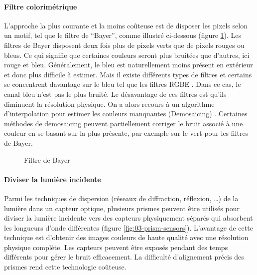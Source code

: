 \documentclass[../thesis.tex]{subfiles}
\begin{document}
    \paragraph{Filtre colorimétrique}
    L'approche la plus courante et la moins coûteuse est de disposer les pixels selon un motif, tel que le filtre de ``Bayer'', comme illustré ci-dessous (figure \ref{fig:03-bayer-filter}). Les filtres de Bayer disposent deux fois plus de pixels verts que de pixels rouges ou bleus. Ce qui signifie que certaines couleurs seront plus bruitées que d'autres, ici rouge et bleu. Généralement, le bleu est naturellement moins présent en extérieur et donc plus difficile à estimer. Mais il existe différents types de filtres et certains se concentrent davantage sur le bleu tel que les filtres RGBE \cite{miao2004generic}. Dans ce cas, le canal bleu n'est pas le plus bruité. Le désavantage de ces filtres est qu'ils diminuent la résolution physique. On a alors recours à un algorithme d'interpolation pour estimer les couleurs manquantes (Demosaicing) \cite{rathi2021convolution}. Certaines méthodes de demosaicing peuvent partiellement corriger le bruit associé à une couleur \cite{tan2014green} en se basant sur la plus présente, par exemple sur le vert pour les filtres de Bayer.
    
    \begin{figure}[H]
        \centering
        
        \caption{Filtre de Bayer}
        \label{fig:03-bayer-filter}
    \end{figure}
    
    \paragraph{Diviser la lumière incidente}
    
    Parmi les techniques de dispersion (réseaux de diffraction, réflexion, \dots) de la lumière dans un capteur optique, plusieurs prismes peuvent être utilisés pour diviser la lumière incidente vers des capteurs physiquement séparés qui absorbent les longueurs d'onde différentes (figure \ref{fig:03-prism-sensors}). L'avantage de cette technique est d'obtenir des images couleurs de haute qualité avec une résolution physique complète. Les capteurs peuvent être exposés pendant des temps différents pour gérer le bruit efficacement. La difficulté d'alignement précis des prismes \cite{galo2006registration} rend cette technologie coûteuse.
    
\end{document}
